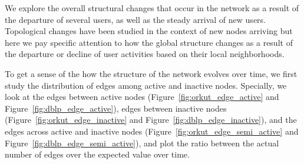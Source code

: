 \documentclass[phd,tocprelim]{cornell}
\begin{document}
We explore the overall structural changes that occur in the network as a result of the departure of several users, as well as the steady arrival of new users. Topological changes have been studied in the context of new nodes arriving but here we pay specific attention to how the global structure changes as a result of the departure or decline of user activities based on their local neighborhoods. 

To get a sense of the how the structure of the network evolves over time, we
first study the distribution of edges among active and inactive
nodes. Specially, we look at the edges between active nodes (Figure~\ref{fig:orkut_edge_active} and Figure~\ref{fig:dblp_edge_active}), edges between
inactive nodes (Figure~\ref{fig:orkut_edge_inactive} and Figure~\ref{fig:dblp_edge_inactive}), and the edges across active and inactive nodes (Figure~\ref{fig:orkut_edge_semi_active} and Figure~\ref{fig:dblp_edge_semi_active}), and plot the
ratio between the actual number of edges over the expected value over time.
\end{document}
